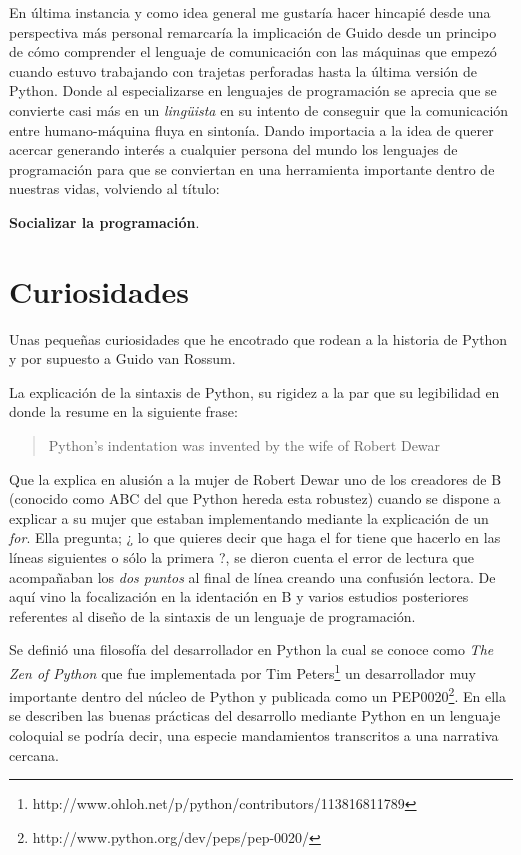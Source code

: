 \documentclass[11pt]{scrartcl}
\begin{document}
En última instancia y como idea general me gustaría hacer hincapié desde una perspectiva más personal remarcaría la implicación de Guido desde un principo de cómo comprender el lenguaje de comunicación con las máquinas que empezó cuando estuvo trabajando con trajetas perforadas hasta la última versión de Python. Donde al especializarse en lenguajes de programación se aprecia que se convierte casi más en un \emph{lingüista} en su intento de conseguir que la comunicación entre humano-máquina fluya en sintonía. Dando importacia a la idea de querer acercar generando interés a cualquier persona del mundo los lenguajes de programación para que se conviertan en una herramienta importante dentro de nuestras vidas, volviendo al título:

\begin{center}
\textbf{Socializar la programación}.
\end{center}

\section{Curiosidades}

Unas pequeñas curiosidades que he encotrado que rodean a la historia de Python y por supuesto a Guido van Rossum.

La explicación de la sintaxis de Python, su rigidez a la par que su legibilidad en donde la resume en la siguiente frase:

\begin{quote}Python's indentation was invented by the wife of Robert Dewar\end{quote}

Que la explica en alusión a la mujer de Robert Dewar uno de los creadores de B (conocido como ABC del que Python hereda esta robustez) cuando se dispone a explicar a su mujer que estaban implementando mediante la explicación de un \emph{for}. Ella pregunta; ¿ lo que quieres decir que haga el for tiene que hacerlo en las líneas siguientes o sólo la primera ?, se dieron cuenta el error de lectura que acompañaban los \emph{dos puntos} al final de línea creando una confusión lectora. De aquí vino la focalización en la identación en B y varios estudios posteriores referentes al diseño de la sintaxis de un lenguaje de programación.

Se definió una filosofía del desarrollador en Python la cual se conoce como \emph{The Zen of Python} que fue implementada por Tim Peters\footnote{http://www.ohloh.net/p/python/contributors/113816811789} un desarrollador muy importante dentro del núcleo de Python y publicada como un PEP0020\footnote{http://www.python.org/dev/peps/pep-0020/}. En ella se describen las buenas prácticas del desarrollo mediante Python en un lenguaje coloquial se podría decir, una especie mandamientos transcritos a una narrativa cercana.
\end{document}
